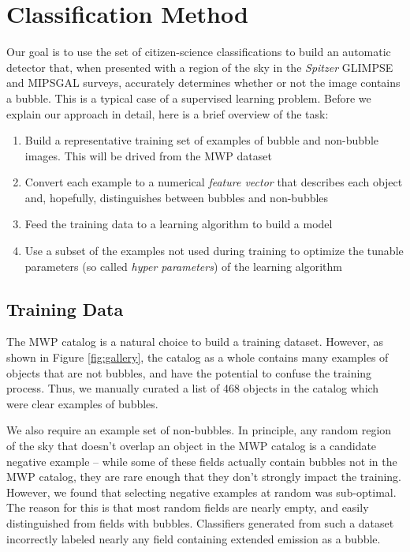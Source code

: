 \documentclass[preprint]{aastex}
\begin{document}
\section{Classification Method}
\label{sec:method}

Our goal is to use the set of citizen-science classifications to build an automatic detector that, when presented with a region of the sky in the \textit{Spitzer} GLIMPSE and MIPSGAL surveys, accurately determines whether or not the image contains a bubble. This is a typical case of a supervised learning problem. Before we explain our approach in detail, here is a brief overview of the task:

\begin{enumerate}
\item Build a representative training set of examples of bubble and non-bubble images. This will be drived from the MWP dataset
\item Convert each example to a numerical \textit{feature vector} that describes each object and, hopefully, distinguishes between bubbles and non-bubbles
\item Feed the training data to a learning algorithm to build a model
\item Use a subset of the examples not used during training to optimize the tunable parameters (so called \textit{hyper parameters}) of the learning algorithm
\end{enumerate}

\subsection{Training Data}
\label{sec:method_training_data}
The MWP catalog is a natural choice to build a training dataset. However, as shown in Figure \ref{fig:gallery}, the catalog as a whole contains many examples of objects that are not bubbles, and have the potential to confuse the training process. Thus, we manually curated a list of 468 objects in the catalog which were clear examples of bubbles. 

We also require an example set of non-bubbles. In principle, any random region of the sky that doesn't overlap an object in the MWP catalog is a candidate negative example -- while some of these fields actually contain bubbles not in the MWP catalog, they are rare enough that they don't strongly impact the training. However, we found that selecting negative examples at random was sub-optimal. The reason for this is that most random fields are nearly empty, and easily distinguished from fields with bubbles. Classifiers generated from such a dataset incorrectly labeled nearly any field containing extended emission as a bubble.
\end{document}
